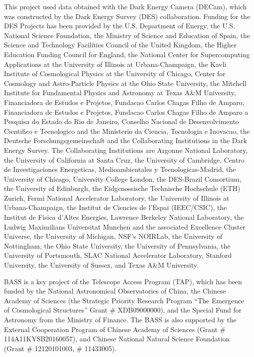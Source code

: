 \documentclass[twocolumn]{aastex631}
\begin{document}
\begin{CJK*}{UTF8}{gbsn}
This project used data obtained with the Dark Energy Camera (DECam), which was constructed by the Dark Energy Survey (DES) collaboration. Funding for the DES Projects has been provided by the U.S. Department of Energy, the U.S. National Science Foundation, the Ministry of Science and Education of Spain, the Science and Technology Facilities Council of the United Kingdom, the Higher Education Funding Council for England, the National Center for Supercomputing Applications at the University of Illinois at Urbana-Champaign, the Kavli Institute of Cosmological Physics at the University of Chicago, Center for Cosmology and Astro-Particle Physics at the Ohio State University, the Mitchell Institute for Fundamental Physics and Astronomy at Texas A\&M University, Financiadora de Estudos e Projetos, Fundacao Carlos Chagas Filho de Amparo, Financiadora de Estudos e Projetos, Fundacao Carlos Chagas Filho de Amparo a Pesquisa do Estado do Rio de Janeiro, Conselho Nacional de Desenvolvimento Cientifico e Tecnologico and the Ministerio da Ciencia, Tecnologia e Inovacao, the Deutsche Forschungsgemeinschaft and the Collaborating Institutions in the Dark Energy Survey. The Collaborating Institutions are Argonne National Laboratory, the University of California at Santa Cruz, the University of Cambridge, Centro de Investigaciones Energeticas, Medioambientales y Tecnologicas-Madrid, the University of Chicago, University College London, the DES-Brazil Consortium, the University of Edinburgh, the Eidgenossische Technische Hochschule (ETH) Zurich, Fermi National Accelerator Laboratory, the University of Illinois at Urbana-Champaign, the Institut de Ciencies de l'Espai (IEEC/CSIC), the Institut de Fisica d'Altes Energies, Lawrence Berkeley National Laboratory, the Ludwig Maximilians Universitat Munchen and the associated Excellence Cluster Universe, the University of Michigan, NSF's NOIRLab, the University of Nottingham, the Ohio State University, the University of Pennsylvania, the University of Portsmouth, SLAC National Accelerator Laboratory, Stanford University, the University of Sussex, and Texas A\&M University.

BASS is a key project of the Telescope Access Program (TAP), which has been funded by the National Astronomical Observatories of China, the Chinese Academy of Sciences (the Strategic Priority Research Program “The Emergence of Cosmological Structures” Grant \# XDB09000000), and the Special Fund for Astronomy from the Ministry of Finance. The BASS is also supported by the External Cooperation Program of Chinese Academy of Sciences (Grant \# 114A11KYSB20160057), and Chinese National Natural Science Foundation (Grant \# 12120101003, \# 11433005).


\end{CJK*}
\end{document}
